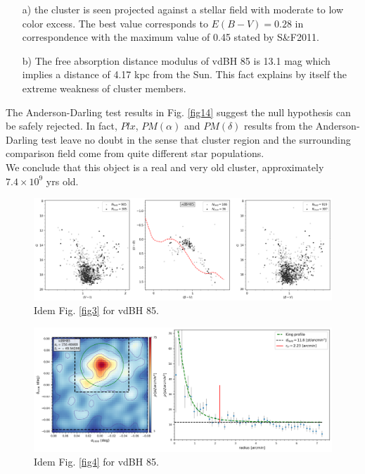 \documentclass[draft]{aa}
\begin{document}
\begin{itemize}
\item [a)] the cluster is seen projected against a stellar field with moderate
    to low color excess. The best value corresponds to $E(B-V) = 0.28$ in
    correspondence with the maximum value of 0.45 stated by S\&F2011.
\item [b)] The free absorption distance modulus of vdBH 85 is
    13.1 mag which implies a distance of 4.17 kpc from the Sun. This fact
    explains by itself the extreme weakness of cluster members.
\end{itemize}

The Anderson-Darling test results in Fig. \ref{fig14} suggest the null
hypothesis can be safely rejected. In fact, $Plx$, $PM(\alpha)$ and
$PM(\delta)$ results from the Anderson-Darling test leave no doubt in the sense
that cluster region and the surrounding comparison field come from quite
different star populations.\\

We conclude that this object is a real and very old cluster, approximately
$7.4\times10^9$ yrs old.

\begin{figure}[ht]
    \centering
    \includegraphics[width=\hsize]{../figs/obs_vdBH85.png}
    \caption{Idem Fig. \ref{fig3} for vdBH 85.}
    \label{fig11}
\end{figure}

\begin{figure}[ht]
    \centering
    \includegraphics[width=\hsize]{../figs/dmap_vdbh85.png}
    \caption{Idem Fig. \ref{fig4} for vdBH 85.}
    \label{fig12}
\end{figure}
\end{document}
